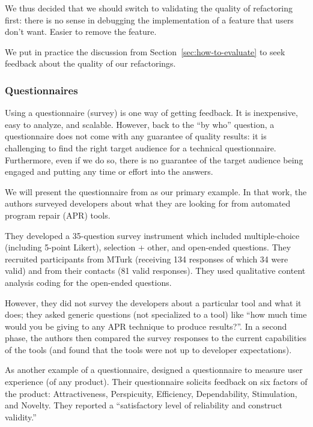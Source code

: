 We thus decided that we should switch to validating the quality of
refactoring first: there is no sense in debugging the implementation of a feature
that users don't want. Easier to remove the feature.

We put in practice the discussion  from Section~\ref{sec:how-to-evaluate}
to seek feedback about the quality of our refactorings.

\subsubsection{Questionnaires}
Using a questionnaire (survey) is one way of getting feedback. It is
inexpensive, easy to analyze, and scalable. However, back to the
``by who'' question, a questionnaire does not come with any
guarantee of quality results: it is challenging to find the right
target audience for a technical questionnaire. Furthermore, even if we
do so, there is no guarantee of the target audience being
engaged and putting any time or effort into the answers.

We will present the questionnaire from
\cite{noller22:_trust_enhan_issues_progr_repair} as our primary
example. In that work, the authors surveyed developers about what they
are looking for from automated program repair (APR) tools.

They developed a
35-question survey instrument which included multiple-choice
(including 5-point Likert), selection + other, and open-ended
questions. They recruited participants from MTurk (receiving 134
responses of which 34 were valid) and from their contacts (81 valid
responses). They used qualitative content analysis coding for the open-ended
questions. 

However, they did not survey the developers about a particular tool
and what it does; they asked generic questions (not specialized to a
tool) like ``how much time would you be giving to any APR technique to
produce results?''. In a second phase, the authors then compared the
survey responses to the current capabilities of the tools (and found
that the tools were not up to developer expectations).

As another example of a questionnaire, 
designed a questionnaire to measure user experience (of any product).
Their questionnaire solicits feedback on
six factors of the product: Attractiveness, Perspicuity, Efficiency, Dependability,
Stimulation, and Novelty. They reported a ``satisfactory level
of reliability and construct validity.''

